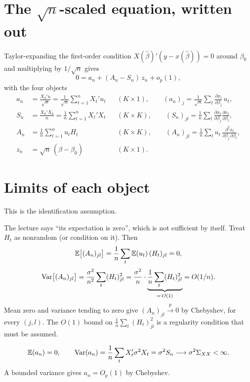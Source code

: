 \documentclass[11pt]{article}
\begin{document}
\section{The $\sqrt{n}$-scaled equation, written out}

Taylor-expanding the first-order condition $X(\hat\beta)'(y-x(\hat\beta))=0$
around $\beta_{0}$ and multiplying by $1/\sqrt{n}$ gives
\[ 0 = a_{n} + (A_{n}-S_{n})\,z_{n} + o_{p}(1), \]
with the four objects
\begin{align*}
 a_{n} &= \frac{X_{0}'u}{\sqrt{n}}
        = \frac{1}{\sqrt{n}}\sum_{t=1}^{n}X_{t}'u_{t}
 && (K\times1), \qquad (a_{n})_{j}
    = \frac{1}{\sqrt{n}}\sum_{t}\frac{\partial x_{t}}{\partial\beta_{j}}\,u_{t},\\[3pt]
 S_{n} &= \frac{X_{0}'X_{0}}{n}
        = \frac{1}{n}\sum_{t=1}^{n}X_{t}'X_{t}
 && (K\times K), \qquad (S_{n})_{jl}
    = \frac{1}{n}\sum_{t}\frac{\partial x_{t}}{\partial\beta_{j}}
      \frac{\partial x_{t}}{\partial\beta_{l}},\\[3pt]
 A_{n} &= \frac{1}{n}\sum_{t=1}^{n}u_{t}H_{t}
 && (K\times K), \qquad (A_{n})_{jl}
    = \frac{1}{n}\sum_{t}u_{t}\,
      \frac{\partial^{2}x_{t}}{\partial\beta_{j}\,\partial\beta_{l}},\\[3pt]
 z_{n} &= \sqrt{n}\,(\hat\beta-\beta_{0})
 && (K\times1).
\end{align*}

\section{Limits of each object}

This is the identification assumption.

The lecture says ``its expectation is zero'', which is not sufficient by itself.
Treat $H_{t}$ as nonrandom (or condition on it). Then
\[ \mathbb{E}\bigl[(A_{n})_{jl}\bigr]
   = \frac{1}{n}\sum_{t}\mathbb{E}(u_{t})\,(H_{t})_{jl} = 0, \]
\[ \operatorname{Var}\bigl[(A_{n})_{jl}\bigr]
   = \frac{\sigma^{2}}{n^{2}}\sum_{t}(H_{t})_{jl}^{2}
   = \frac{\sigma^{2}}{n}\cdot
     \underbrace{\frac{1}{n}\sum_{t}(H_{t})_{jl}^{2}}_{=\,O(1)}
   = O(1/n). \]
Mean zero and variance tending to zero give $(A_{n})_{jl}\xrightarrow{p}0$ by
Chebyshev, for every $(j,l)$. The $O(1)$ bound on
$\frac{1}{n}\sum_{t}(H_{t})_{jl}^{2}$ is a regularity condition that must be
assumed.

\[ \mathbb{E}(a_{n}) = 0, \qquad
   \operatorname{Var}(a_{n}) = \frac{1}{n}\sum_{t}X_{t}'\sigma^{2}X_{t}
   = \sigma^{2}S_{n} \longrightarrow \sigma^{2}\Sigma_{XX} < \infty. \]
A bounded variance gives $a_{n}=O_{p}(1)$ by Chebyshev.
\end{document}
